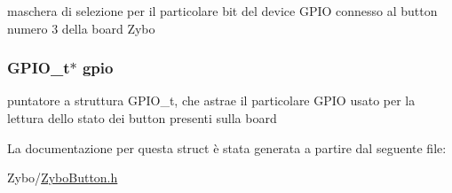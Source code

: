 maschera di selezione per il particolare bit del device G\+P\+I\+O connesso al button numero 3 della board Zybo \hypertarget{struct_zybo_button__t_acb3116190992a4d8d26545c103304d27}{
\subsubsection[{gpio}]{\setlength{\rightskip}{0pt plus 5cm}G\+P\+I\+O\+\_\+t$\ast$ gpio}}\label{struct_zybo_button__t_acb3116190992a4d8d26545c103304d27}
puntatore a struttura G\+P\+I\+O\+\_\+t, che astrae il particolare G\+P\+I\+O usato per la lettura dello stato dei button presenti sulla board 

La documentazione per questa struct è stata generata a partire dal seguente file\+:\begin{DoxyCompactItemize}
\item 
Zybo/\hyperlink{_zybo_button_8h}{Zybo\+Button.\+h}\end{DoxyCompactItemize}
